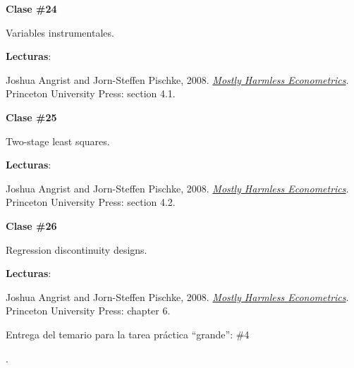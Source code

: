 \documentclass[letterpaper]{article}
\renewenvironment{itemize}{
  \begin{list}{}{
    \setlength{\leftmargin}{1.5em}
  }
}{
  \end{list}
}
\begin{document}
\begin{enumerate}
      \begin{itemize} 
        \item[$\bullet$] {\bf Clase \#24}
          \begin{itemize} 
            \item[$\circ$] Variables instrumentales.
            \item[$\circ$] {\bf Lecturas}: 
              \begin{itemize}
                \item[$\diamond$] Joshua Angrist and Jorn-Steffen Pischke, 2008. \href{https://github.com/hbahamonde/Metodos_Cuanti_I/raw/master/Readings/MHE.pdf}{\emph{Mostly Harmless Econometrics}}. Princeton University Press: section 4.1.
              \end{itemize}
          \end{itemize}
      \end{itemize}




      \begin{itemize} 
        \item[$\bullet$] {\bf Clase \#25}
          \begin{itemize} 
            \item[$\circ$] Two-stage least squares.
            \item[$\circ$] {\bf Lecturas}: 
              \begin{itemize}
                \item[$\diamond$] Joshua Angrist and Jorn-Steffen Pischke, 2008. \href{https://github.com/hbahamonde/Metodos_Cuanti_I/raw/master/Readings/MHE.pdf}{\emph{Mostly Harmless Econometrics}}. Princeton University Press: section 4.2.
              \end{itemize}
          \end{itemize}
      \end{itemize}



      \begin{itemize} 
        \item[$\bullet$] {\bf Clase \#26}
          \begin{itemize} 
            \item[$\circ$] Regression discontinuity designs.
            \item[$\circ$] {\bf Lecturas}: 
              \begin{itemize}
                \item[$\diamond$] Joshua Angrist and Jorn-Steffen Pischke, 2008. \href{https://github.com/hbahamonde/Metodos_Cuanti_I/raw/master/Readings/MHE.pdf}{\emph{Mostly Harmless Econometrics}}. Princeton University Press: chapter 6.
                {\color{orange}\item[$\bigstar$] Entrega del temario para la tarea pr\'actica ``grande'': \#4}.
              \end{itemize}
          \end{itemize}
      \end{itemize}



\end{enumerate}
\end{document}
